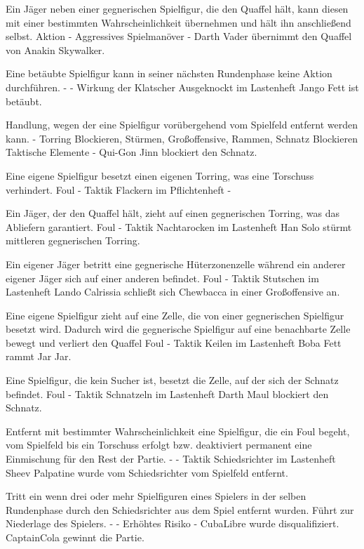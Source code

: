 {Ein Jäger neben einer gegnerischen Spielfigur, die den Quaffel hält, kann diesen mit einer bestimmten Wahrscheinlichkeit übernehmen und hält ihn anschließend selbst.}
{Aktion}
{-}
{Aggressives Spielmanöver}
{-}
{Darth Vader übernimmt den Quaffel von Anakin Skywalker.}

{Eine betäubte Spielfigur kann in seiner nächsten Rundenphase keine Aktion durchführen.}
{-}
{-}
{Wirkung der Klatscher}
{\glqq{}Ausgeknockt\grqq{}  im Lastenheft}
{Jango Fett ist betäubt.}

{Handlung, wegen der eine Spielfigur vorübergehend vom Spielfeld entfernt werden kann.}
{-}
{Torring Blockieren, Stürmen, Großoffensive, Rammen, Schnatz Blockieren}
{Taktische Elemente}
{-}
{Qui-Gon Jinn blockiert den Schnatz.}

{Eine eigene Spielfigur besetzt einen eigenen Torring, was eine Torschuss verhindert.}
{Foul}
{-}
{Taktik}
{\glqq{}Flackern\grqq{}  im Pflichtenheft}
{-}

{Ein Jäger, der den Quaffel hält, zieht auf einen gegnerischen Torring, was das Abliefern garantiert.}
{Foul}
{-}
{Taktik}
{\glqq{}Nachtarocken\grqq{}  im Lastenheft}
{Han Solo stürmt mittleren gegnerischen Torring.}

{Ein eigener Jäger betritt eine gegnerische Hüterzonenzelle während ein anderer eigener Jäger sich auf einer anderen befindet.}
{Foul}
{-}
{Taktik}
{\glqq{}Stutschen\grqq{}  im Lastenheft}
{Lando Calrissia schließt sich Chewbacca in einer Großoffensive an.}

{Eine eigene Spielfigur zieht auf eine Zelle, die von einer gegnerischen Spielfigur besetzt wird. Dadurch wird die gegnerische Spielfigur auf eine benachbarte Zelle bewegt und verliert den Quaffel}
{Foul}
{-}
{Taktik}
{\glqq{}Keilen\grqq{}  im Lastenheft}
{Boba Fett rammt Jar Jar.}

{Eine Spielfigur, die kein Sucher ist, besetzt die Zelle, auf der sich der Schnatz befindet.}
{Foul}
{-}
{Taktik}
{\glqq{}Schnatzeln\grqq{}  im Lastenheft}
{Darth Maul blockiert den Schnatz.}

{Entfernt mit bestimmter Wahrscheinlichkeit eine Spielfigur, die ein Foul begeht, vom Spielfeld bis ein Torschuss erfolgt bzw. deaktiviert permanent eine Einmischung für den Rest der Partie.}
{-}
{-}
{Taktik}
{\glqq{}Schiedsrichter\grqq{}  im Lastenheft}
{Sheev Palpatine wurde vom Schiedsrichter vom Spielfeld entfernt.}

{Tritt ein wenn drei oder mehr Spielfiguren eines Spielers in der selben Rundenphase durch den Schiedsrichter aus dem Spiel entfernt wurden. Führt zur Niederlage des Spielers.}
{-}
{-}
{Erhöhtes Risiko}
{-}
{CubaLibre wurde disqualifiziert. CaptainCola gewinnt die Partie.}
